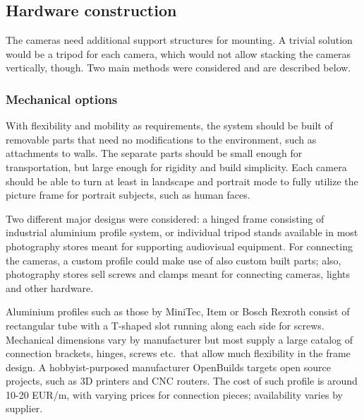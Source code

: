 

\subsection{Hardware construction} %

The cameras need additional support structures for mounting.
A trivial solution would be a tripod for each camera, which would not allow stacking the cameras vertically, though.
Two main methods were considered and are described below.

\subsubsection{Mechanical options}

With flexibility and mobility as requirements, the system should be built of removable parts that need no modifications to the environment, such as attachments to walls.
The separate parts should be small enough for transportation, but large enough for rigidity and build simplicity.
Each camera should be able to turn at least in landscape and portrait mode to fully utilize the picture frame for portrait subjects, such as human faces.

Two different major designs were considered: a hinged frame consisting of industrial aluminium profile system, or individual tripod stands available in most photography stores meant for supporting audiovisual equipment.
For connecting the cameras, a custom profile could make use of also custom built parts; also, photography stores sell screws and clamps meant for connecting cameras, lights and other hardware.

Aluminium profiles such as those by MiniTec, Item or Bosch Rexroth consist of rectangular tube with a T-shaped slot running along each side for screws. %
Mechanical dimensions vary by manufacturer but most supply a large catalog of connection brackets, hinges, screws etc.\ that allow much flexibility in the frame design.
A hobbyist-purposed manufacturer OpenBuilds targets open source projects, such as 3D printers and CNC routers.
The cost of such profile is around 10-20 EUR/m, with varying prices for connection pieces; availability varies by supplier.


